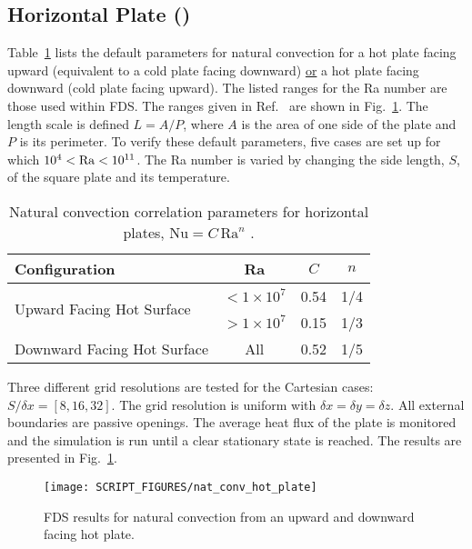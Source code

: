 \documentclass[11pt]{book}
\begin{document}
\subsection{Horizontal Plate (\texorpdfstring{}{nat\_conv\_hot\_plate})}
\label{sec:nat_conv_hot_plate}

Table~\ref{tab:nat_conv_horizontal_default} lists the default parameters for natural convection for a hot plate facing upward (equivalent to a cold plate facing downward) \underline{or} a hot plate facing downward (cold plate facing upward). The listed ranges for the Ra number are those used within FDS. The ranges given in Ref.~\cite{Incropera:1} are shown in Fig.~\ref{fig_nat_conv_hot_plate}. The length scale is defined $L=A/P$, where $A$ is the area of one side of the plate and $P$ is its perimeter. To verify these default parameters, five cases are set up for which $10^4 < {\rm Ra} < 10^{11}$. The Ra number is varied by changing the side length, $S$, of the square plate and its temperature.

\begin{table}[h]
\centering
\caption[Natural convection correlation parameters for horizontal plates]{Natural convection correlation parameters for horizontal plates, $\mathrm{Nu}=C \, \mathrm{Ra}^n$ \cite{Incropera:1}.}
\label{tab:nat_conv_horizontal_default}
\begin{tabular}{lccc}
Configuration                                & Ra                       & $C$   & $n$  \\
\hline
\multirow{2}{*}{Upward Facing Hot Surface}   & $ <1 \times 10^7$        & 0.54  & 1/4  \\
                                             & $ >1 \times 10^7$        & 0.15  & 1/3  \\
Downward Facing Hot Surface &  All                                      & 0.52  & 1/5  \\
\end{tabular}
\end{table}

Three different grid resolutions are tested for the Cartesian cases: $S/\delta x = [8,16,32]$.  The grid resolution is uniform with $\delta x = \delta y = \delta z$. All external boundaries are passive openings. The average heat flux of the plate is monitored and the simulation is run until a clear stationary state is reached.  The results are presented in Fig.~\ref{fig_nat_conv_hot_plate}.

\begin{figure}[h]
   \centering
   \texttt{[image: SCRIPT\_FIGURES/nat\_conv\_hot\_plate]}
   \caption[Nusselt correlation natural convection from a hot, horizontal plate]{FDS results for natural convection from an upward and downward facing hot plate.}
   \label{fig_nat_conv_hot_plate}
\end{figure}
\end{document}
